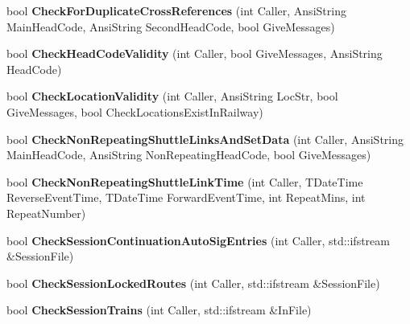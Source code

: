 \begin{DoxyCompactItemize}
\mbox{\label{class_t_train_controller_a232adcf919e3d70f2fc0cdc4d3bb2ee4}} 
bool {\bfseries Check\+For\+Duplicate\+Cross\+References} (int Caller, Ansi\+String Main\+Head\+Code, Ansi\+String Second\+Head\+Code, bool Give\+Messages)
\item 
\mbox{\label{class_t_train_controller_a1ccd6c8f2c24e7417889e1a91cb9ca2f}} 
bool {\bfseries Check\+Head\+Code\+Validity} (int Caller, bool Give\+Messages, Ansi\+String Head\+Code)
\item 
\mbox{\label{class_t_train_controller_a1925032d5e41decf4befc07b35521d3c}} 
bool {\bfseries Check\+Location\+Validity} (int Caller, Ansi\+String Loc\+Str, bool Give\+Messages, bool Check\+Locations\+Exist\+In\+Railway)
\item 
\mbox{\label{class_t_train_controller_aa991976bc8ea956f9e9230f6a6921ac1}} 
bool {\bfseries Check\+Non\+Repeating\+Shuttle\+Links\+And\+Set\+Data} (int Caller, Ansi\+String Main\+Head\+Code, Ansi\+String Non\+Repeating\+Head\+Code, bool Give\+Messages)
\item 
\mbox{\label{class_t_train_controller_a45168500acc985a1573602e0c00a0d9a}} 
bool {\bfseries Check\+Non\+Repeating\+Shuttle\+Link\+Time} (int Caller, T\+Date\+Time Reverse\+Event\+Time, T\+Date\+Time Forward\+Event\+Time, int Repeat\+Mins, int Repeat\+Number)
\item 
\mbox{\label{class_t_train_controller_a96985493678231bbcad15b36c0c63579}} 
bool {\bfseries Check\+Session\+Continuation\+Auto\+Sig\+Entries} (int Caller, std\+::ifstream \&Session\+File)
\item 
\mbox{\label{class_t_train_controller_a4d5ebc5a4b6dda080840913822f3f238}} 
bool {\bfseries Check\+Session\+Locked\+Routes} (int Caller, std\+::ifstream \&Session\+File)
\item 
\mbox{\label{class_t_train_controller_a53fb58a1ae6103601a24ad2162f86f58}} 
bool {\bfseries Check\+Session\+Trains} (int Caller, std\+::ifstream \&In\+File)
\item 

\end{DoxyCompactItemize}
